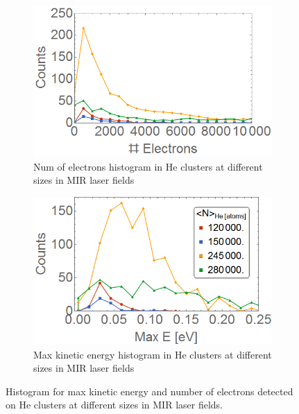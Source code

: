 \begin{figure}[h!]
\centering
\begin{subfigure}[l]{0.49\textwidth}\caption{Num of electrons histogram in He clusters at different sizes in MIR laser fields}
\includegraphics[width=1\textwidth]{../Images/results/Mir_He_Dropletsize/Helec.png} 
\end{subfigure}
\begin{subfigure}[l]{0.49\textwidth}\caption{Max kinetic energy histogram in He clusters at different sizes in MIR laser fields}
\includegraphics[width=1\textwidth]{../Images/results/Mir_He_Dropletsize/Henerg.png}   				\end{subfigure}
\caption[MIR He droplet scan histograms]{Histogram for max kinetic energy and number of electrons detected on He clusters at different sizes in MIR laser fields.}
\label{fig:histodropletsize}
\end{figure}

